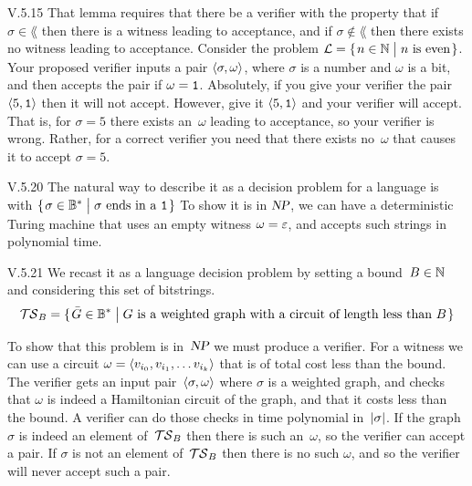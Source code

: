 %
\begin{ans}{V.5.15}
That lemma requires that there be a verifier with the property
that if $\sigma\in\lang$ then there is a witness leading to acceptance,
and if $\sigma\notin\lang$ then there exists no witness leading to
acceptance.
Consider the problem $\lang=\set{n\in\N\suchthat \text{$n$ is even}}$.
Your proposed verifier inputs a pair $\langle\sigma,\omega\rangle$,
where $\sigma$ is a number and $\omega$ is a bit, and then
accepts the pair if $\omega=\texttt{1}$.
Absolutely, if you give your verifier the pair  $\langle5,\texttt{1}\rangle$
then it will not accept.
However,
give it $\langle5,\texttt{1}\rangle$ and your verifier will accept.
That is, for $\sigma=5$ there exists an~$\omega$ leading to acceptance,
so your verifier is wrong.
Rather, for a correct verifier you need that there exists no~$\omega$ that
causes it to accept $\sigma=5$.
\end{ans}
%
%
%
%
%
\begin{ans}{V.5.20}
The natural way to describe it as a decision problem for a language
is with
$\set{\sigma\in\kleenestar{\B}\suchthat \text{$\sigma$ ends in a \str{1}}}$
To show it is in $\textsl{NP}$, we can have a deterministic Turing machine
that uses an empty witness $\omega=\varepsilon$, and accepts such
strings in polynomial time.
\end{ans}
%
\begin{ans}{V.5.21}
We recast it as a language decision problem
by setting a bound~$B\in\mathbb{N}$ and considering this set of bitstrings.
\begin{equation*}
  \TS_B=\set{\bar{G}\in\kleenestar{\B}\suchthat
    \text{$G$ is a weighted graph with a circuit of length less than~$B$}}
\end{equation*}

To show that this problem is in~$\textsl{NP}$ we must produce a verifier.
For a witness we can use a circuit
$\omega=\langle v_{i_0},v_{i_1},\ldots v_{i_k}\rangle$ that
is of total cost less than the bound.
The verifier gets an input pair~$\langle\sigma,\omega\rangle$ where
$\sigma$ is a weighted graph, and checks
that $\omega$ is indeed a Hamiltonian circuit of the graph, and that it
costs less than the bound.
A verifier can do those checks in time polynomial in~$|\sigma|$.
If the graph $\sigma$ is indeed an element of~$\mathcal{T\kern-0.5pt S}_B$ then there is
such an~$\omega$, so the verifier can accept a pair.
If $\sigma$ is not an element of~$\mathcal{T\kern-0.5pt S}_B$ then there is no such
$\omega$, and so the verifier will never accept such a pair.
\end{ans}

